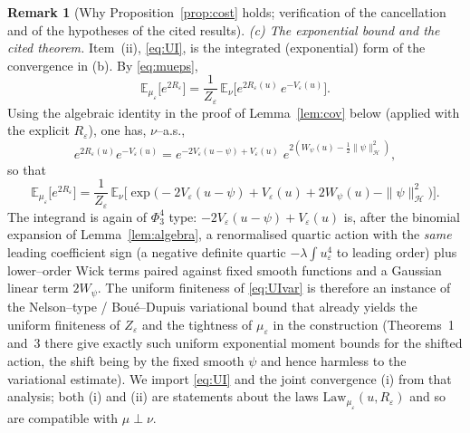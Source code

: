 \documentclass[12pt]{article}
\theoremstyle{definition}
\newtheorem{remark}{Remark}
\newcommand{\E}{\mathbb{E}}
\begin{document}
\begin{remark}[Why Proposition~\ref{prop:cost} holds; verification of the cancellation and
of the hypotheses of the cited results]
\emph{(c) The exponential bound and the cited theorem.} Item~\textup{(ii)},
\eqref{eq:UI}, is the integrated (exponential) form of the convergence in \textup{(b)}.
By \eqref{eq:mueps},
\[
  \E_{\mu_\varepsilon}\!\big[e^{2R_\varepsilon}\big]
  =\frac{1}{Z_\varepsilon}\,\E_\nu\!\Big[e^{2R_\varepsilon(u)}\,e^{-V_\varepsilon(u)}\Big].
\]
Using the algebraic identity in the proof of Lemma~\ref{lem:cov} below
(applied with the explicit $R_\varepsilon$), one has, $\nu$--a.s.,
\[
  e^{2R_\varepsilon(u)}e^{-V_\varepsilon(u)}
  =e^{-2V_\varepsilon(u-\psi)+V_\varepsilon(u)}\;e^{2(W_\psi(u)-\frac12\|\psi\|^2_{\mathcal H})},
\]
so that
\begin{equation}\label{eq:UIvar}
  \E_{\mu_\varepsilon}\!\big[e^{2R_\varepsilon}\big]
  =\frac{1}{Z_\varepsilon}\,\E_\nu\!\Big[\exp\!\big(-2V_\varepsilon(u-\psi)+V_\varepsilon(u)
       +2W_\psi(u)-\|\psi\|_{\mathcal H}^2\big)\Big].
\end{equation}
The integrand is again of $\Phi^4_3$ type: $-2V_\varepsilon(u-\psi)+V_\varepsilon(u)$ is,
after the binomial expansion of Lemma~\ref{lem:algebra}, a renormalised quartic action with
the \emph{same} leading coefficient sign (a negative definite quartic
$-\lambda\int u_\varepsilon^4$ to leading order) plus lower--order Wick terms paired against
fixed smooth functions and a Gaussian linear term $2W_\psi$. The uniform finiteness of
\eqref{eq:UIvar} is therefore an instance of the Nelson--type / Bou\'e--Dupuis variational
bound that already yields the uniform finiteness of $Z_\varepsilon$ and the tightness of
$\mu_\varepsilon$ in the construction \cite{BG} (Theorems~1 and~3 there give exactly such
uniform exponential moment bounds for the shifted action, the shift being by the fixed
smooth $\psi$ and hence harmless to the variational estimate). We import \eqref{eq:UI} and
the joint convergence \textup{(i)} from that analysis; both \textup{(i)} and \textup{(ii)}
are statements about the laws $\mathrm{Law}_{\mu_\varepsilon}(u,R_\varepsilon)$ and so are
compatible with $\mu\perp\nu$.
\end{remark}
\end{document}
